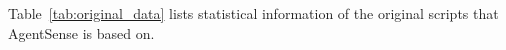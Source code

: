 Table~\ref{tab:original_data} lists statistical information of the original scripts that AgentSense is based on.